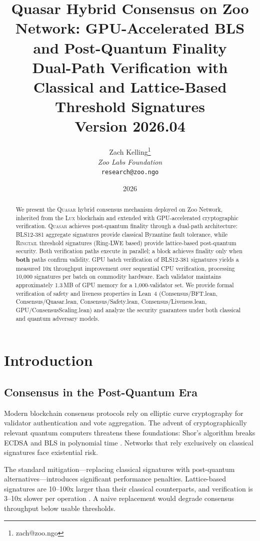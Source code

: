 \documentclass[11pt,letterpaper]{article}
\title{\textbf{Quasar Hybrid Consensus on Zoo Network: GPU-Accelerated BLS and Post-Quantum Finality}\\
\large Dual-Path Verification with Classical and Lattice-Based Threshold Signatures\\
\vspace{5pt}
\normalsize Version 2026.04}
\author{
Zach Kelling\thanks{zach@zoo.ngo}\\
\textit{Zoo Labs Foundation}\\
\texttt{research@zoo.ngo}
}
\date{2026}
\theoremstyle{definition}
\theoremstyle{remark}
\newcommand{\Lux}{\textsc{Lux}}
\newcommand{\Quasar}{\textsc{Quasar}}
\newcommand{\Ringtail}{\textsc{Ringtail}}
\begin{document}
\zoocoverpage

\begin{abstract}
We present the \Quasar{} hybrid consensus mechanism deployed on Zoo Network, inherited from the \Lux{} blockchain and extended with GPU-accelerated cryptographic verification. \Quasar{} achieves post-quantum finality through a dual-path architecture: BLS12-381 aggregate signatures provide classical Byzantine fault tolerance, while \Ringtail{} threshold signatures (Ring-LWE based) provide lattice-based post-quantum security. Both verification paths execute in parallel; a block achieves finality only when \textbf{both} paths confirm validity. GPU batch verification of BLS12-381 signatures yields a measured 10x throughput improvement over sequential CPU verification, processing 10,000 signatures per batch on commodity hardware. Each validator maintains approximately 1.3\,MB of GPU memory for a 1,000-validator set. We provide formal verification of safety and liveness properties in Lean~4 (Consensus/BFT.lean, Consensus/Quasar.lean, Consensus/Safety.lean, Consensus/Liveness.lean, GPU/ConsensusScaling.lean) and analyze the security guarantees under both classical and quantum adversary models.
\end{abstract}

\tableofcontents
\newpage

\section{Introduction}

\subsection{Consensus in the Post-Quantum Era}

Modern blockchain consensus protocols rely on elliptic curve cryptography for validator authentication and vote aggregation. The advent of cryptographically relevant quantum computers threatens these foundations: Shor's algorithm breaks ECDSA and BLS in polynomial time \cite{shor1997polynomial}. Networks that rely exclusively on classical signatures face existential risk.

The standard mitigation---replacing classical signatures with post-quantum alternatives---introduces significant performance penalties. Lattice-based signatures are 10--100x larger than their classical counterparts, and verification is 3--10x slower per operation \cite{nist2024pqc}. A naive replacement would degrade consensus throughput below usable thresholds.
\end{document}
